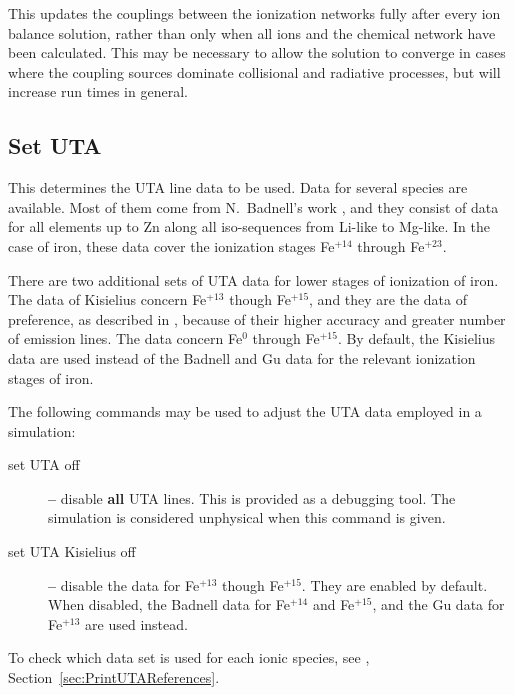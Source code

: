 This updates the couplings between the ionization networks fully after
every ion balance solution, rather than only when all ions and the
chemical network have been calculated.  This may be necessary to allow
the solution to converge in cases where the coupling sources dominate
collisional and radiative processes, but will increase run times in
general.


\subsection{Set UTA}
\label{sec:SetUTA}

\par
This determines the UTA line data to be used.
Data for several species are available.
Most of them come from N.~Badnell's work
\citep{BadnellSeaton2003,Badnell+2005},
and they consist of data for all elements
up to Zn along all iso-sequences from
Li-like to Mg-like.
In the case of iron, these data cover the ionization stages
Fe$^{+14}$ through Fe$^{+23}$.

\par
There are two additional sets of UTA data
for lower stages of ionization of iron.
The data of Kisielius \citep{Kisielius2003,Ferland+2013}
concern Fe$^{+13}$ though Fe$^{+15}$, and they are the data of
preference, as described in \citet{CloudyReview13}, because
of their higher accuracy and greater number of emission lines.
The \citet{Gu2006} data concern Fe$^0$ through Fe$^{+15}$.
By default, the Kisielius data are used instead of the Badnell
and Gu data for the relevant ionization stages of iron.

\par
The following commands may be used to adjust the UTA data employed
in a simulation:
%
\begin{description}
\item[set UTA off] {\bf --} disable {\bf all} UTA lines.
	This is provided as a debugging tool.
	The simulation is considered unphysical when this
	command is given.

\item[set UTA Kisielius off] {\bf --} disable the \citet{Kisielius2003} data
	for Fe$^{+13}$ though Fe$^{+15}$.  They are enabled by default.
	When disabled, the Badnell data for Fe$^{+14}$ and Fe$^{+15}$,
	and the Gu data for Fe$^{+13}$ are used instead.
\end{description}

\par
To check which data set is used for each ionic species,
see , Section~\ref{sec:PrintUTAReferences}.


